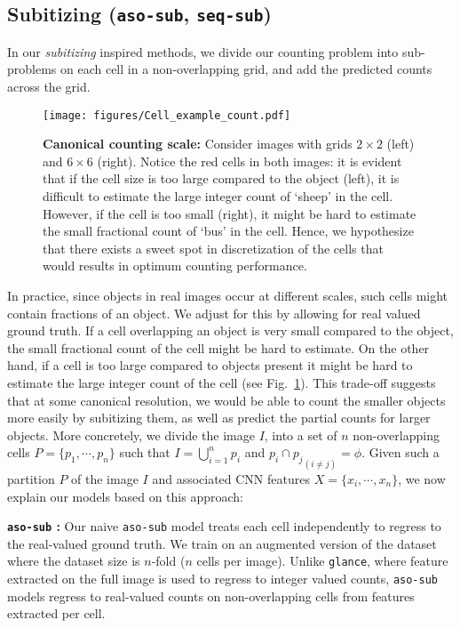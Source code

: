 \documentclass[10pt,twocolumn,letterpaper]{article}
\newcommand{\sub}{\texttt{aso-sub}\xspace}
\newcommand{\seq}{\texttt{seq-sub}\xspace}
\newcommand{\glance}{\texttt{glance}\xspace}
\begin{document}
\subsection{Subitizing (\sub{}, \seq{})}\label{app:aso-sub}
In our \emph{subitizing} inspired methods, we divide our counting problem into sub-problems on each cell in a non-overlapping grid, and add the predicted counts across the grid. 
\begin{figure}[t]
\texttt{[image: figures/Cell\_example\_count.pdf]}
\vspace{-15pt}
\caption{\footnotesize{\textbf{Canonical counting scale:} Consider images with grids $2\times2$ (left) and $6\times6$ (right). Notice the red cells in both images: it is evident that if the cell size is too large compared to the object (left), it is difficult to estimate the large integer count of `sheep' in the cell. However, if the cell is too small (right), it might be hard to estimate the small fractional count of `bus' in the cell. Hence, we hypothesize that there exists a sweet spot in discretization of the cells that would results in optimum counting performance.}}
\label{fig:cell_example}
\vspace{-20pt}
\end{figure}
In practice, since objects in real images occur at different scales, such cells might contain fractions of an object. We adjust for this by allowing for real valued ground truth. If a cell overlapping an object is very small compared to the object, the small fractional count of the cell might be hard to estimate. On the other hand, if a cell is too large compared to objects present it might be hard to estimate the large integer count of the cell (see Fig.~\ref{fig:cell_example}). This trade-off suggests that at some canonical resolution, we would be able to count the smaller objects more easily by subitizing them, as well as predict the partial counts for larger objects. 
More concretely, we divide the image $I$, into a set of $n$ non-overlapping cells $P = \{p_{1},\cdots,p_{n}\}$ such that $I = \bigcup_{i=1}^np_{i}$ and ${p_{i}\cap{}p_{j}}_{(i\neq j)}=\phi$. Given such a partition $P$ of the image $I$ and associated CNN features $X = \{x_{i},\cdots,x_{n}\}$, we now explain our models based on this approach:
\par \noindent
\textbf{\sub{} :} Our naive \sub{} model treats each cell independently to regress to the real-valued ground truth. We train on an augmented version of the dataset where the dataset size is $n$-fold ($n$ cells per image). Unlike \glance, where feature extracted on the full image is used to regress to integer valued counts, \sub models regress to real-valued counts on non-overlapping cells from features extracted per cell.
\end{document}
